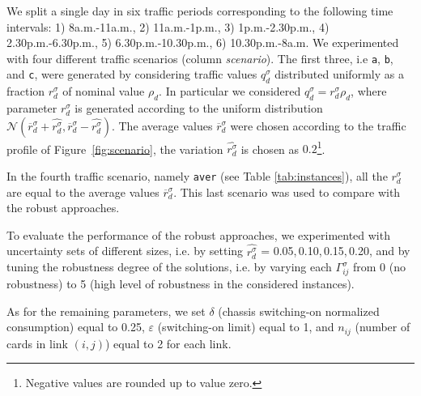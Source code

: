 \documentclass[final,5p,times,twocolumn]{elsarticle}
\begin{document}
We split a single day in six traffic periods corresponding to the following time intervals: 1) 8a.m.-11a.m., 2) 11a.m.-1p.m., 3) 1p.m.-2.30p.m., 4) 2.30p.m.-6.30p.m., 5) 6.30p.m.-10.30p.m., 6) 10.30p.m.-8a.m.
We experimented with four different traffic scenarios (column \emph{scenario}). The first three, i.e {\tt a}, {\tt b}, and {\tt c}, were generated by considering traffic values $q_d^{\sigma}$ distributed uniformly as a fraction $r_d^{\sigma}$ of nominal value $\rho_d$. In particular we considered $q_d^{\sigma}=r_d^{\sigma} \rho_d$, where parameter $r_d^{\sigma}$ is generated according to the uniform distribution $\mathcal{N}(\overline{r}_d^{\sigma}+\hat{r_d^{\sigma}},\overline{r}_d^{\sigma}-\hat{r_d^{\sigma}})$. The average values $\overline{r}_d^{\sigma}$ were chosen according to the traffic profile of Figure~\ref{fig:scenario}, the variation $\hat{r_d^{\sigma}}$ is chosen as $0.2$\footnote{Negative values are rounded up to value zero.}. 
 
In the fourth traffic scenario, namely {\tt aver} (see Table \ref{tab:instances}), all the $r_d^{\sigma}$ are equal to the average values $\overline{r}_d^{\sigma}$. This last scenario was used to compare with the robust approaches. 

To evaluate the performance of the robust approaches, we experimented with uncertainty sets of different sizes, i.e. by setting $\hat{r_d^{\sigma}}$ = 0.05,\,0.10,\,0.15,\,0.20, and by tuning the robustness degree of the solutions, i.e. by varying each $\Gamma_{ij}^{\sigma}$ from 0 (no robustness) to 5 (high level of robustness in the considered instances).

As for the remaining parameters, we set $\delta$ (chassis switching-on normalized consumption) equal to 0.25, $\varepsilon$ (switching-on limit) equal to 1, and $n_{ij}$ (number of cards in link $(i,j)$) equal to 2 for each link.
\end{document}
